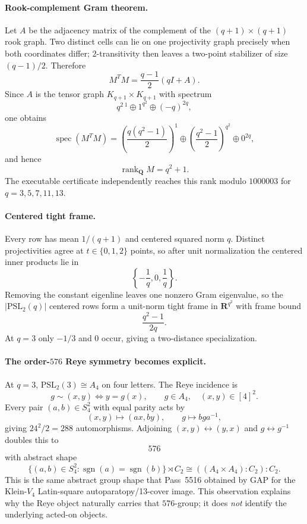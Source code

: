\paragraph{Rook-complement Gram theorem.}
Let $A$ be the adjacency matrix of the complement of the
$(q+1)\times(q+1)$ rook graph.  Two distinct cells can lie on one projectivity
graph precisely when both coordinates differ; $2$-transitivity then leaves a
two-point stabilizer of size $(q-1)/2$.  Therefore
\[
 \boxed{
 M^TM=\frac{q-1}{2}(qI+A).
 }
\]
Since $A$ is the tensor graph $K_{q+1}\times K_{q+1}$ with spectrum
\[
 q^2{}^{\,1}\oplus1^{q^2}\oplus(-q)^{2q},
\]
one obtains
\[
 \boxed{
 \operatorname{spec}(M^TM)=
 \left(\frac{q(q^2-1)}2\right)^1
 \oplus
 \left(\frac{q^2-1}{2}\right)^{q^2}
 \oplus0^{2q},
 }
\]
and hence
\[
 \boxed{\operatorname{rank}_{\mathbf Q}M=q^2+1.}
\]
The executable certificate independently reaches this rank modulo $1000003$
for $q=3,5,7,11,13$.

\paragraph{Centered tight frame.}
Every row has mean $1/(q+1)$ and centered squared norm $q$.  Distinct
projectivities agree at $t\in\{0,1,2\}$ points, so after unit normalization the
centered inner products lie in
\[
 \boxed{\left\{-\frac1q,0,\frac1q\right\}.}
\]
Removing the constant eigenline leaves one nonzero Gram eigenvalue, so the
$|\mathrm{PSL}_2(q)|$ centered rows form a unit-norm tight frame in $\mathbf R^{q^2}$
with frame bound
\[
 \boxed{\frac{q^2-1}{2q}.}
\]
At $q=3$ only $-1/3$ and $0$ occur, giving a two-distance specialization.

\paragraph{The order-$576$ Reye symmetry becomes explicit.}
At $q=3$, $\mathrm{PSL}_2(3)\cong A_4$ on four letters.  The Reye incidence is
\[
 g\sim(x,y)\iff y=g(x),
 \qquad g\in A_4,\quad(x,y)\in[4]^2.
\]
Every pair $(a,b)\in S_4^2$ with equal parity acts by
\[
 (x,y)\mapsto(ax,by),
 \qquad g\mapsto bga^{-1},
\]
giving $24^2/2=288$ automorphisms.  Adjoining
$(x,y)\leftrightarrow(y,x)$ and $g\leftrightarrow g^{-1}$ doubles this to
\[
 \boxed{576}
\]
with abstract shape
\[
 \boxed{
 \{(a,b)\in S_4^2:\operatorname{sgn}(a)=\operatorname{sgn}(b)\}\rtimes C_2
 \cong ((A_4\times A_4):C_2):C_2.
 }
\]
This is the same abstract group shape that Pass~5516 obtained by GAP for the
Klein-$V_4$ Latin-square autoparatopy/13-cover image.  This observation explains
why the Reye object naturally carries that $576$-group; it does \emph{not}
identify the underlying acted-on objects.

